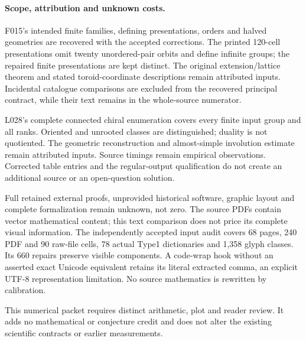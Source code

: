 \documentclass[11pt,a4paper]{article}
\begin{document}
\paragraph{Scope, attribution and unknown costs.}
F015's intended finite families, defining presentations, orders and halved geometries are recovered with the accepted corrections. The printed 120-cell presentations omit twenty unordered-pair orbits and define infinite groups; the repaired finite presentations are kept distinct. The original extension/lattice theorem and stated toroid-coordinate descriptions remain attributed inputs. Incidental catalogue comparisons are excluded from the recovered principal contract, while their text remains in the whole-source numerator.

L028's complete connected chiral enumeration covers every finite input group and all ranks. Oriented and unrooted classes are distinguished; duality is not quotiented. The geometric reconstruction and almost-simple involution estimate remain attributed inputs. Source timings remain empirical observations. Corrected table entries and the regular-output qualification do not create an additional source or an open-question solution.

Full retained external proofs, unprovided historical software, graphic layout and complete formalization remain unknown, not zero. The source PDFs contain vector mathematical content; this text comparison does not price its complete visual information. The independently accepted input audit covers 68 pages, 240 PDF and 90 raw-file cells, 78 actual Type1 dictionaries and 1,358 glyph classes. Its 660 repairs preserve visible components. A code-wrap hook without an asserted exact Unicode equivalent retains its literal extracted comma, an explicit UTF-8 representation limitation. No source mathematics is rewritten by calibration.

This numerical packet requires distinct arithmetic, plot and reader review. It adds no mathematical or conjecture credit and does not alter the existing scientific contracts or earlier measurements.
\end{document}
